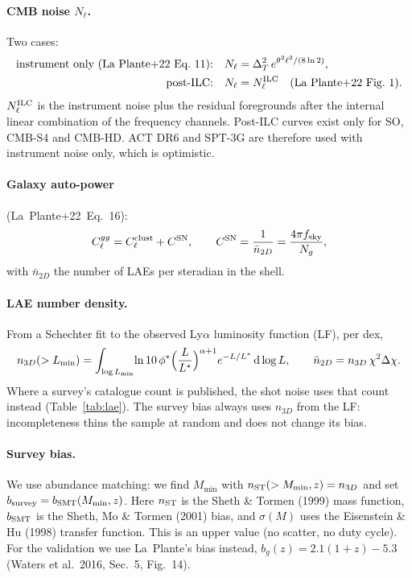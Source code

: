 \documentclass[11pt]{article}
\newcommand{\LP}{La~Plante+22}
\begin{document}
\paragraph{CMB noise $N_\ell$.} Two cases:
\begin{align}
\text{instrument only (\LP\ Eq.~11):}\quad & N_\ell = \Delta_T^2\,e^{\theta^2\ell^2/(8\ln2)},\\
\text{post-ILC:}\quad & N_\ell = N_\ell^{\rm ILC}\quad\text{(\LP\ Fig.~1)}.
\end{align}
$N_\ell^{\rm ILC}$ is the instrument noise plus the residual foregrounds after the internal linear combination of the frequency channels. Post-ILC curves exist only for SO, CMB-S4 and CMB-HD. ACT DR6 and SPT-3G are therefore used with instrument noise only, which is optimistic.

\paragraph{Galaxy auto-power} (\LP\ Eq.~16):
\begin{equation}
C_\ell^{gg}=C_\ell^{\rm clust}+C^{\rm SN},\qquad C^{\rm SN}=\frac{1}{\bar n_{2D}}=\frac{4\pi f_{\rm sky}}{N_g},
\end{equation}
with $\bar n_{2D}$ the number of LAEs per steradian in the shell.

\paragraph{LAE number density.} From a Schechter fit to the observed Ly$\alpha$ luminosity function (LF), per dex,
\begin{equation}
n_{3D}(>L_{\min})=\int_{\log L_{\min}}\! \ln10\,\phi^*\Bigl(\frac{L}{L^*}\Bigr)^{\alpha+1} e^{-L/L^*}\,{\rm d}\log L,\qquad
\bar n_{2D}=n_{3D}\,\chi^2\Delta\chi .
\end{equation}
Where a survey's catalogue count is published, the shot noise uses that count instead (Table~\ref{tab:lae}). The survey bias always uses $n_{3D}$ from the LF: incompleteness thins the sample at random and does not change its bias.

\paragraph{Survey bias.} We use abundance matching: we find $M_{\min}$ with $n_{\rm ST}(>M_{\min},z)=n_{3D}$ and set $b_{\rm survey}=b_{\rm SMT}(M_{\min},z)$. Here $n_{\rm ST}$ is the Sheth \& Tormen (1999) mass function, $b_{\rm SMT}$ is the Sheth, Mo \& Tormen (2001) bias, and $\sigma(M)$ uses the Eisenstein \& Hu (1998) transfer function. This is an upper value (no scatter, no duty cycle). For the validation we use La~Plante's bias instead, $b_g(z)=2.1(1+z)-5.3$ (Waters et al.\ 2016, Sec.~5, Fig.~14).
\end{document}
